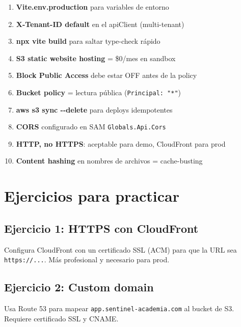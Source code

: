 \documentclass[11pt,a4paper,oneside]{article}
\begin{document}
\begin{tcolorbox}[colback=okgreen!5!white,colframe=okgreen,title={\textbf{Checklist Fase 3}}]
\begin{enumerate}
  \item \textbf{Vite.env.production} para variables de entorno
  \item \textbf{X-Tenant-ID default} en el apiClient (multi-tenant)
  \item \textbf{npx vite build} para saltar type-check r\'apido
  \item \textbf{S3 static website hosting} = \$0/mes en sandbox
  \item \textbf{Block Public Access} debe estar OFF antes de la policy
  \item \textbf{Bucket policy} = lectura p\'ublica (\texttt{Principal: "*"})
  \item \textbf{aws s3 sync -{}-delete} para deploys idempotentes
  \item \textbf{CORS} configurado en SAM \texttt{Globals.Api.Cors}
  \item \textbf{HTTP, no HTTPS}: aceptable para demo, CloudFront para prod
  \item \textbf{Content hashing} en nombres de archivos = cache-busting
\end{enumerate}
\end{tcolorbox}

\section{Ejercicios para practicar}

\subsection{Ejercicio 1: HTTPS con CloudFront}

Configura CloudFront con un certificado SSL (ACM) para que la URL sea \texttt{https://...}. M\'as profesional y necesario para prod.

\subsection{Ejercicio 2: Custom domain}

Usa Route 53 para mapear \texttt{app.sentinel-academia.com} al bucket de S3. Requiere certificado SSL y CNAME.
\end{document}
